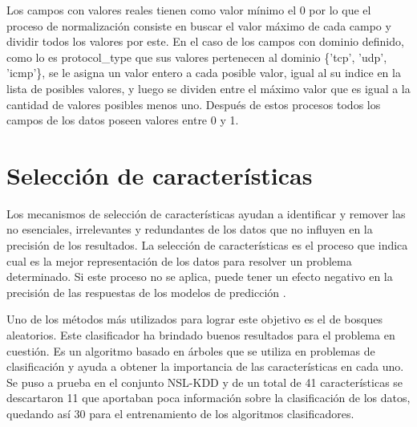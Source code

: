Los campos con valores reales tienen como valor mínimo el 0 por lo que el proceso de normalización consiste en buscar el valor máximo de cada campo y dividir todos los valores por este. En el caso de los campos con dominio definido, como lo es protocol\_type que sus valores pertenecen al dominio \{'tcp', 'udp', 'icmp'\}, se le asigna un valor entero a cada posible valor, igual al su indice en la lista de posibles valores, y luego se dividen entre el máximo valor que es igual a la cantidad de valores posibles menos uno. Después de estos procesos todos los campos de los datos poseen valores entre 0 y 1.

\section{Selección de características}
Los mecanismos de selección de características ayudan a identificar y remover las no esenciales, irrelevantes y redundantes de los datos que no influyen en la precisión de los resultados. La selección de características es el proceso que indica cual es la mejor representación de los datos para resolver un problema determinado. Si este proceso no se aplica, puede tener un efecto negativo en la precisión de las respuestas de los modelos de predicción \cite{tuv2009feature}.

Uno de los métodos más utilizados para lograr este objetivo es el de bosques aleatorios. Este clasificador ha brindado buenos resultados para el problema en cuestión. Es un algoritmo basado en árboles que se utiliza en problemas de clasificación y ayuda a obtener la importancia de las características en cada uno. Se puso a prueba en el conjunto NSL-KDD y de un total de 41 características se descartaron 11 que aportaban poca información sobre la clasificación de los datos, quedando así 30 para el entrenamiento de los algoritmos clasificadores.

